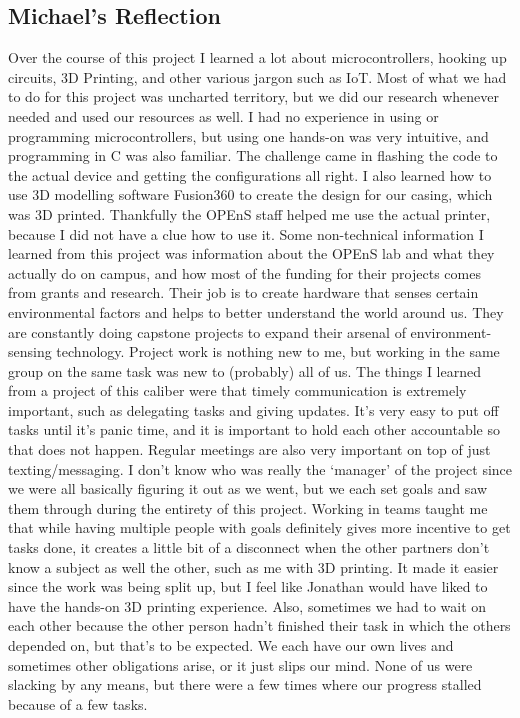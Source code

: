 \documentclass[letterpaper,10pt,draftclsnofoot,onecolumn]{article}
\begin{document}
\subsection{Michael's Reflection}
Over the course of this project I learned a lot about microcontrollers, hooking up circuits, 3D Printing, and other various jargon such as IoT. Most of what we had to do for this project was uncharted territory, but we did our research whenever needed and used our resources as well. I had no experience in using or programming microcontrollers, but using one hands-on was very intuitive, and programming in C was also familiar. The challenge came in flashing the code to the actual device and getting the configurations all right. I also learned how to use 3D modelling software Fusion360 to create the design for our casing, which was 3D printed. Thankfully the OPEnS staff helped me use the actual printer, because I did not have a clue how to use it.
\newline
\newline
Some non-technical information I learned from this project was information about the OPEnS lab and what they actually do on campus, and how most of the funding for their projects comes from grants and research. Their job is to create hardware that senses certain environmental factors and helps to better understand the world around us. They are constantly doing capstone projects to expand their arsenal of environment-sensing technology. 
\newline
\newline
Project work is nothing new to me, but working in the same group on the same task was new to (probably) all of us. The things I learned from a project of this caliber were that timely communication is extremely important, such as delegating tasks and giving updates. It’s very easy to put off tasks until it’s panic time, and it is important to hold each other accountable so that does not happen. Regular meetings are also very important on top of just texting/messaging. I don’t know who was really the ‘manager’ of the project since we were all basically figuring it out as we went, but we each set goals and saw them through during the entirety of this project. Working in teams taught me that while having multiple people with goals definitely gives more incentive to get tasks done, it creates a little bit of a disconnect when the other partners don’t know a subject as well the other, such as me with 3D printing. It made it easier since the work was being split up, but I feel like Jonathan would have liked to have the hands-on 3D printing experience. Also, sometimes we had to wait on each other because the other person hadn’t finished their task in which the others depended on, but that’s to be expected. We each have our own lives and sometimes other obligations arise, or it just slips our mind. None of us were slacking by any means, but there were a few times where our progress stalled because of a few tasks. 
\end{document}

